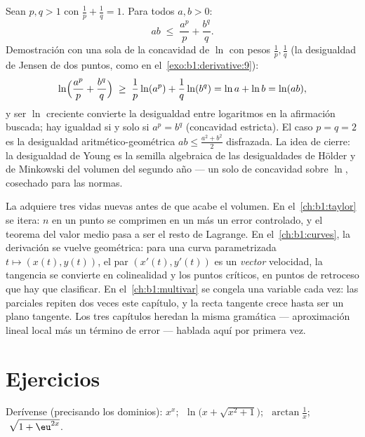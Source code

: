 \begin{example}\label{ex:b1:derivative:young}
Sean $p, q > 1$ con $\frac1p + \frac1q = 1$. Para todos $a, b > 0$:
\[
ab \;\leq\; \frac{a^p}{p} + \frac{b^q}{q} .
\]
Demostración con una sola  de la concavidad de $\ln$ con
pesos $\frac1p, \frac1q$ (la desigualdad de Jensen de dos puntos,
como en el~\cref{exo:b1:derivative:9}):
\[
\ln\Bigl(\frac{a^p}{p} + \frac{b^q}{q}\Bigr)
\;\geq\; \frac1p \ln(a^p) + \frac1q \ln(b^q)
= \ln a + \ln b = \ln(ab),
\]
y ser $\ln$ creciente convierte la desigualdad entre logaritmos en la
afirmación buscada; hay igualdad si y solo si $a^p = b^q$ (concavidad
estricta). El caso $p = q = 2$ es la desigualdad
aritmético-geométrica $ab \leq \frac{a^2 + b^2}{2}$ disfrazada. La
idea de cierre: la desigualdad de Young es la semilla algebraica de
las desigualdades de Hölder y de Minkowski del volumen del segundo
año --- un solo  de concavidad sobre $\ln$, cosechado para
las normas.
\end{example}

\begin{remark}
La  adquiere tres vidas nuevas antes de que acabe el
volumen. En el~\cref{ch:b1:taylor} se itera: $n$  en un
punto se comprimen en un  más un error controlado, y el
teorema del valor medio pasa a ser el resto de Lagrange. En
el~\cref{ch:b1:curves}, la derivación se vuelve geométrica: para una
curva parametrizada $t \mapsto (x(t), y(t))$, el par
$(x'(t), y'(t))$ es un \emph{vector} velocidad, la tangencia se
convierte en colinealidad y los puntos críticos, en puntos de
retroceso que hay que clasificar. En el~\cref{ch:b1:multivar} se
congela una variable cada vez: las  parciales repiten dos
veces este capítulo, y la recta tangente crece hasta ser un plano
tangente. Los tres capítulos heredan la misma gramática ---
aproximación lineal local más un término de error --- hablada aquí
por primera vez.
\end{remark}

\section{Ejercicios}

\begin{exercise}[$\star$]\label{exo:b1:derivative:1}
Derívense (precisando los dominios): $x^x$;
$\;\ln\bigl(x + \sqrt{x^2+1}\bigr)$; $\;\arctan\frac{1}{x}$;
$\;\sqrt{1 + \eu^{2x}}$.
\end{exercise}

